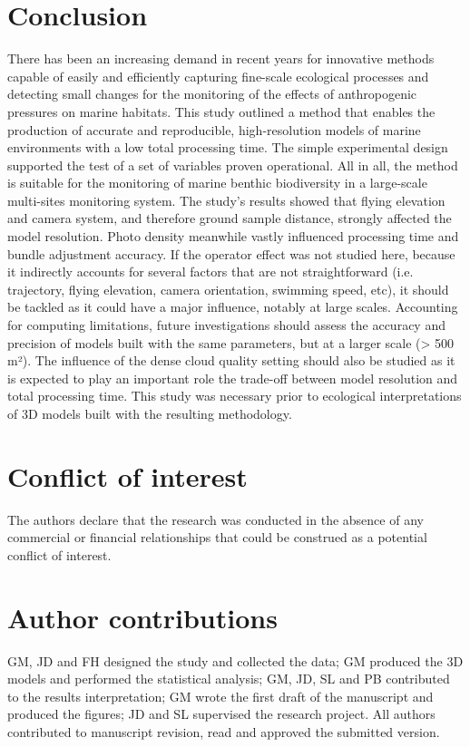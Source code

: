\section{Conclusion}\label{chapitre1_5}
There has been an increasing demand in recent years for innovative methods capable of easily and efficiently capturing fine-scale ecological processes and detecting small changes for the monitoring of the effects of anthropogenic pressures on marine habitats. This study outlined a method that enables the production of accurate and reproducible, high-resolution models of marine environments with a low total processing time. The simple experimental design supported the test of a set of variables proven operational. All in all, the method is suitable for the monitoring of marine benthic biodiversity in a large-scale multi-sites monitoring system. The study’s results showed that flying elevation and camera system, and therefore ground sample distance, strongly affected the model resolution. Photo density meanwhile vastly influenced processing time and bundle adjustment accuracy. If the operator effect was not studied here, because it indirectly accounts for several factors that are not straightforward (i.e. trajectory, flying elevation, camera orientation, swimming speed, etc), it should be tackled as it could have a major influence, notably at large scales. Accounting for computing limitations, future investigations should assess the accuracy and precision of models built with the same parameters, but at a larger scale (> 500 m²). The influence of the dense cloud quality setting should also be studied as it is expected to play an important role the trade-off between model resolution and total processing time. This study was necessary prior to ecological interpretations of 3D models built with the resulting methodology. 

\section{Conflict of interest}\label{chapitre1_6}
The authors declare that the research was conducted in the absence of any commercial or financial relationships that could be construed as a potential conflict of interest.

\section{Author contributions}\label{chapitre1_7}
GM, JD and FH designed the study and collected the data; GM produced the 3D models and performed the statistical analysis; GM, JD, SL and PB contributed to the results interpretation; GM wrote the first draft of the manuscript and produced the figures; JD and SL supervised the research project. All authors contributed to manuscript revision, read and approved the submitted version.

